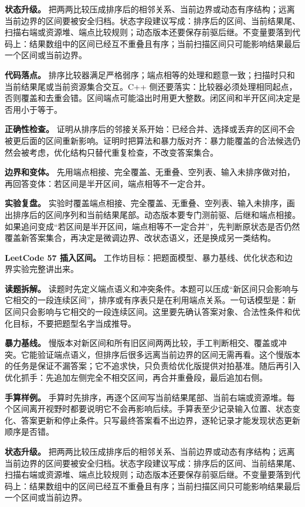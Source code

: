 \textbf{状态升级。} 把两两比较压成排序后的相邻关系、当前边界或动态有序结构；远离当前边界的区间要被安全归档。状态字段建议写成：排序后的区间、当前结果尾、扫描右端或资源堆、端点比较规则；动态版本还要保存前驱后继。不变量要落到代码上：结果数组中的区间已经互不重叠且有序；当前扫描区间只可能影响结果最后一个区间或当前边界。

\textbf{代码落点。} 排序比较器满足严格弱序；端点相等的处理和题意一致；扫描时只和当前结果尾或当前资源集合交互。C++ 侧还要落实：比较器必须处理相同起点，否则覆盖和去重会错。区间端点可能溢出时用更大整数。闭区间和半开区间决定是否用小于等于。

\textbf{正确性检查。} 证明从排序后的邻接关系开始：已经合并、选择或丢弃的区间不会被更后面的区间重新影响。证明时把算法和暴力版对齐：暴力能覆盖的合法候选仍然会被考虑，优化结构只替代重复检查，不改变答案集合。

\textbf{边界和变体。} 先用端点相接、完全覆盖、无重叠、空列表、输入未排序做对拍，再回答变体：若区间是半开区间，端点相等不一定合并。

\textbf{实验复盘。} 实验时覆盖端点相接、完全覆盖、无重叠、空列表、输入未排序，画出排序后的区间序列和当前结果尾部。动态版本要专门测前驱、后继和端点相接。如果追问变成“若区间是半开区间，端点相等不一定合并”，先判断原状态是否仍然覆盖新答案集合，再决定是微调边界、改状态语义，还是换成另一类结构。

\noindent\textbf{LeetCode 57 插入区间。} 工作坊目标：把题面模型、暴力基线、优化状态和边界实验完整讲出来。

\textbf{读题拆解。} 读题时先定义端点语义和冲突条件。本题可以压成“新区间只会影响与它相交的一段连续区间”，排序或有序表只是在利用端点关系。一句话模型是：新区间只会影响与它相交的一段连续区间。这里要先确认答案对象、合法性条件和优化目标，不要把题型名字当成推导。

\textbf{暴力基线。} 慢版本对新区间和所有旧区间两两比较，手工判断相交、覆盖或冲突。它能验证端点语义，但排序后很多远离当前边界的区间无需再看。这个慢版本的任务是保证不漏答案；它不追求快，只负责给优化版提供对拍基准。随后再引入优化抓手：先追加左侧完全不相交区间，再合并重叠段，最后追加右侧。

\textbf{手算样例。} 手算时先排序，再逐个区间写当前结果尾部、当前右端或资源堆。每个区间离开视野时都要说明它不会再影响后续。手算表至少记录输入位置、状态变化、答案更新和停止条件。只写最终答案看不出边界，逐轮记录才能发现状态更新顺序是否错。

\textbf{状态升级。} 把两两比较压成排序后的相邻关系、当前边界或动态有序结构；远离当前边界的区间要被安全归档。状态字段建议写成：排序后的区间、当前结果尾、扫描右端或资源堆、端点比较规则；动态版本还要保存前驱后继。不变量要落到代码上：结果数组中的区间已经互不重叠且有序；当前扫描区间只可能影响结果最后一个区间或当前边界。

